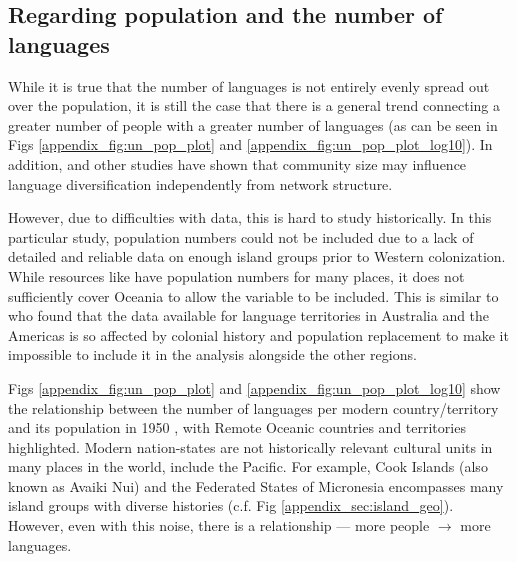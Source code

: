 \documentclass[unnumsec,webpdf,modern,medium]{oup-authoring-template}
\begin{document}
\subsection{Regarding population and the number of languages}
\label{appendix_pop_vs_languages}
While it is true that the number of languages is not entirely evenly spread out over the population, it is still the case that there is a general trend connecting a greater number of people with a greater number of languages (as can be seen in Figs \ref{appendix_fig:un_pop_plot} and \ref{appendix_fig:un_pop_plot_log10}). In addition,  \citet{raviv2019larger} and other studies have shown that community size may influence language diversification independently from network structure. 

However, due to difficulties with data, this is hard to study historically. In this particular study, population numbers could not be included due to a lack of detailed and reliable data on enough island groups prior to Western colonization. While resources like \citet{elcat} have population numbers for many places, it does not sufficiently cover Oceania to allow the variable to be included. This is similar to \citet[7340-7341]{curriemace2009} who found that the data available for language territories in Australia and the Americas is so affected by colonial history and population replacement to make it impossible to include it in the analysis alongside the other regions. 

Figs \ref{appendix_fig:un_pop_plot} and \ref{appendix_fig:un_pop_plot_log10} show the relationship between the number of languages per modern country/territory \citep{glottolog3} and its population in 1950 \citep{UN_pop}, with Remote Oceanic countries and territories highlighted. Modern nation-states are not historically relevant cultural units in many places in the world, include the Pacific. For example, Cook Islands (also known as Avaiki Nui) and the Federated States of Micronesia encompasses many island groups with diverse histories (c.f. Fig \ref{appendix_sec:island_geo}). However, even with this noise, there is a relationship --- more people $\rightarrow$ more languages.
\end{document}
